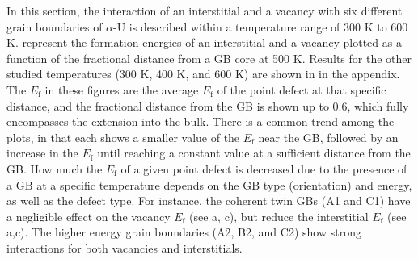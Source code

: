 \documentclass[review]{elsarticle}
\begin{document}
In this section, the interaction of an interstitial and a vacancy with six different grain boundaries of $\alpha$-U is described within a temperature range of 300 K to 600 K.  represent the formation energies of an interstitial and a vacancy plotted as a function of the fractional distance from a GB core at 500 K. Results for the other studied temperatures (300 K, 400 K, and 600 K) are shown in  in the appendix. The $E_{\mathrm{f}}$ in these figures are the average $E_{\mathrm{f}}$ of the point defect at that specific distance, and the fractional distance from the GB is shown up to 0.6, which fully encompasses the extension into the bulk. There is a common trend among the plots, in that each shows a smaller value of the $E_{\mathrm{f}}$ near the GB, followed by an increase in the $E_{\mathrm{f}}$ until reaching a constant value at a sufficient distance from the GB. How much the $E_{\mathrm{f}}$ of a given point defect is decreased due to the presence of a GB at a specific temperature depends on the GB type (orientation) and energy, as well as the defect type. For instance, the coherent twin GBs (A1 and C1) have a negligible effect on the vacancy $E_{\mathrm{f}}$ (see a, c), but reduce the interstitial $E_{\mathrm{f}}$ (see  a,c). The higher energy grain boundaries (A2, B2, and C2) show strong interactions for both vacancies and interstitials. 
\end{document}
